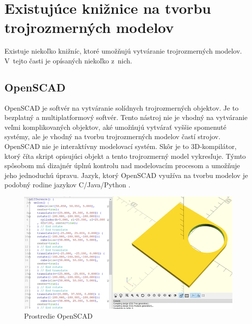 \section{Existujúce knižnice na tvorbu trojrozmerných  modelov} \label{sec:existing_libraries}
Existuje niekoľko knižníc, ktoré umožňujú vytváranie trojrozmerných modelov. V~tejto časti je opísaných niekoľko z~nich.\nopagebreak

\subsection*{OpenSCAD}
OpenSCAD je softvér na vytváranie solídnych trojrozmerných objektov. Je to bezplatný a multiplatformový softvér. Tento nástroj nie je vhodný na vytváranie veľmi komplikovaných objektov, aké umožňujú vytvárať vyššie spomenuté systémy, ale je vhodný na tvorbu trojrozmerných modelov častí strojov. OpenSCAD nie je interaktívny modelovací systém. Skôr je to 3D-kompilátor, ktorý číta skript opisujúci objekt a tento trojrozmerný model vykresľuje.  Týmto spôsobom má dizajnér úplnú kontrolu nad modelovacím procesom a umožňuje jeho jednoduchú úpravu. Jazyk, ktorý OpenSCAD využíva na tvorbu modelov je podobný rodine jazykov C/Java/Python \cite{horvath20163d}.

\nopagebreak
\begin{figure}[H]
    \centering
    \includegraphics[width = 0.9\linewidth]{obrazky-figures/programs/openSCAD.png}
    \caption{Prostredie OpenSCAD  \protect\footnotemark }
    \label{fig:OpenSCAD}
\end{figure}


